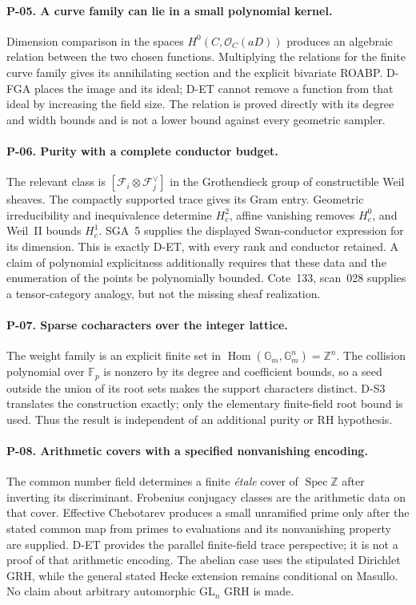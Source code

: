 \documentclass[11pt,a4paper]{article}
\theoremstyle{definition}\newtheorem{definition}{Definition}
\begin{document}
\paragraph{P-05. A curve family can lie in a small polynomial kernel.}
Dimension comparison in the spaces $H^0(C,\mathcal O_C(aD))$ produces an algebraic relation between the two chosen functions. Multiplying the relations for the finite curve family gives its annihilating section and the explicit bivariate ROABP. D-FGA places the image and its ideal; D-ET cannot remove a function from that ideal by increasing the field size. The relation is proved directly with its degree and width bounds and is not a lower bound against every geometric sampler.

\paragraph{P-06. Purity with a complete conductor budget.}
The relevant class is $[\mathcal F_i\otimes\mathcal F_j^\vee]$ in the Grothendieck group of constructible Weil sheaves. The compactly supported trace gives its Gram entry. Geometric irreducibility and inequivalence determine $H_c^2$, affine vanishing removes $H_c^0$, and Weil~II bounds $H_c^1$. SGA~5 supplies the displayed Swan-conductor expression for its dimension. This is exactly D-ET, with every rank and conductor retained. A claim of polynomial explicitness additionally requires that these data and the enumeration of the points be polynomially bounded. Cote~133, scan~028 supplies a tensor-category analogy, but not the missing sheaf realization.

\paragraph{P-07. Sparse cocharacters over the integer lattice.}
The weight family is an explicit finite set in $\operatorname{Hom}(\mathbb G_m,\mathbb G_m^n)=\mathbb Z^n$. The collision polynomial over $\mathbb F_p$ is nonzero by its degree and coefficient bounds, so a seed outside the union of its root sets makes the support characters distinct. D-S3 translates the construction exactly; only the elementary finite-field root bound is used. Thus the result is independent of an additional purity or RH hypothesis.

\paragraph{P-08. Arithmetic covers with a specified nonvanishing encoding.}
The common number field determines a finite \emph{\'etale} cover of $\operatorname{Spec}\mathbb Z$ after inverting its discriminant. Frobenius conjugacy classes are the arithmetic data on that cover. Effective Chebotarev produces a small unramified prime only after the stated common map from primes to evaluations and its nonvanishing property are supplied. D-ET provides the parallel finite-field trace perspective; it is not a proof of that arithmetic encoding. The abelian case uses the stipulated Dirichlet GRH, while the general stated Hecke extension remains conditional on Masullo. No claim about arbitrary automorphic $\mathrm{GL}_n$ GRH is made.
\end{document}
